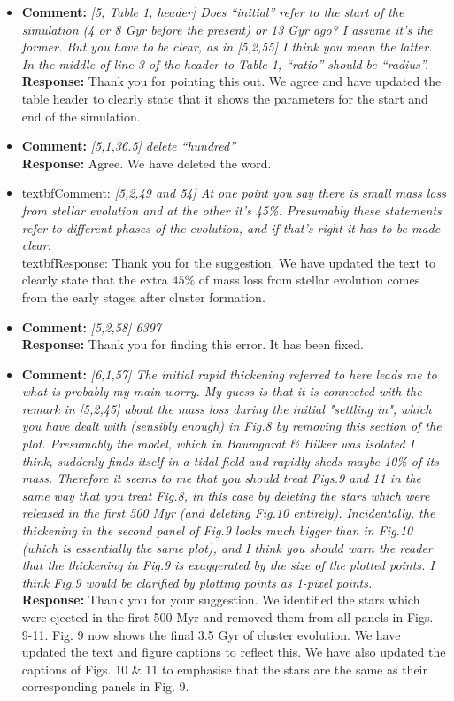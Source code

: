 \documentclass[aps,prl,reprint,showpacs,floatfix,superscriptaddress, onecolumn, 12pt]{revtex4-2}
\begin{document}
\begin{itemize}
    \item
    \textbf{Comment:} \textit{[5, Table 1, header] Does ``initial'' refer to the start of the
simulation (4 or 8 Gyr before the present) or 13 Gyr ago? I assume
it's the former. But you have to be clear, as in [5,2,55] I think you
mean the latter. In the middle of line 3 of the header to Table 1,
``ratio'' should be ``radius''.}\\
    \textbf{Response:} Thank you for pointing this out. We agree and have updated the table header to clearly state that it shows the parameters for the start and end of the simulation.

    \item
    \textbf{Comment:} \textit{[5,1,36.5] delete ``hundred''}\\
    \textbf{Response:} Agree. We have deleted the word.

    \item
    textbf{Comment:} \textit{[5,2,49 and 54] At one point you say there is small mass loss from
stellar evolution and at the other it's 45\%. Presumably these
statements refer to different phases of the evolution, and if that's
right it has to be made clear.}\\
    textbf{Response:} Thank you for the suggestion. We have updated the text to clearly state that the extra $45\%$ of mass loss from stellar evolution comes from the early stages after cluster formation.

    \item
    \textbf{Comment:} \textit{[5,2,58] 6397}\\
    \textbf{Response:} Thank you for finding this error. It has been fixed.

    \item
    \textbf{Comment:} \textit{[6,1,57] The initial rapid thickening referred to here leads me to
what is probably my main worry. My guess is that it is connected with
the remark in [5,2,45] about the mass loss during the initial
"settling in", which you have dealt with (sensibly enough) in Fig.8 by
removing this section of the plot. Presumably the model, which in
Baumgardt \& Hilker was isolated I think, suddenly finds itself in a
tidal field and rapidly sheds maybe 10\% of its mass. Therefore it
seems to me that you should treat Figs.9 and 11 in the same way that
you treat Fig.8, in this case by deleting the stars which were
released in the first 500 Myr (and deleting Fig.10 entirely).
Incidentally, the thickening in the second panel of Fig.9 looks much
bigger than in Fig.10 (which is essentially the same plot), and I
think you should warn the reader that the thickening in Fig.9 is
exaggerated by the size of the plotted points. I think Fig.9 would be
clarified by plotting points as 1-pixel points.}\\
    \textbf{Response:} Thank you for your suggestion. We identified the stars which were ejected in the first 500 Myr and removed them from all panels in Figs. 9-11. Fig. 9 now shows the final 3.5 Gyr of cluster evolution. We have updated the text and figure captions to reflect this. We have also updated the captions of Figs. 10 \& 11 to emphasise that the stars are the same as their corresponding panels in Fig. 9.


\end{itemize}
\end{document}
